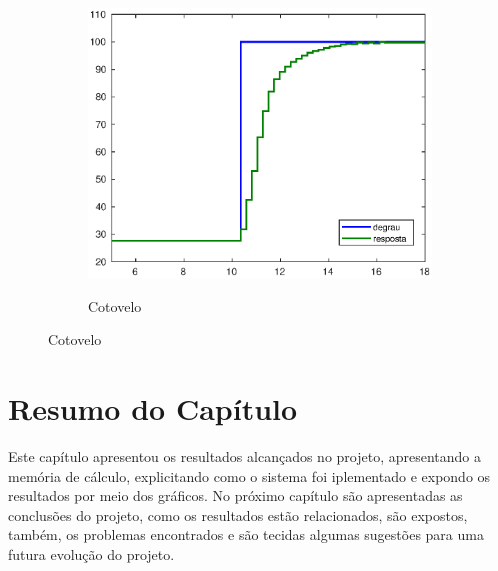 \begin{figure}[h!]
\begin{subfigure}{.5\textwidth}
    \label{fig:shoulder_hilFase2}
  \end{subfigure}%
  \\[5ex]
  \begin{subfigure}{\textwidth}
    \centering
    \caption{Cotovelo}
    \includegraphics[width = 0.5\columnwidth]{Imagens/forearm_hilFase3}
    \label{fig:forearm_hilFase2}
  \end{subfigure}%
  
  \label{fig:hilFase3} 

\end{figure}

\section{Resumo do Capítulo}

Este capítulo apresentou os resultados alcançados no projeto, apresentando a memória de cálculo,
explicitando como o sistema foi iplementado e expondo os resultados por meio dos gráficos. No próximo
capítulo são apresentadas as conclusões do projeto, como os resultados estão relacionados, são expostos, também, 
os problemas encontrados e são tecidas algumas sugestões para uma futura evolução do projeto.


\clearpage